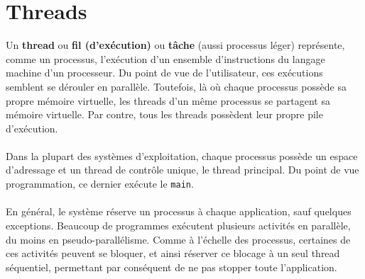 	\section{Threads}
		\begin{frame}
			Un \textbf{thread} ou \textbf{fil (d'exécution)} ou \textbf{tâche} (aussi processus léger) représente, comme un processus, l'exécution d'un ensemble d'instructions du langage machine d'un processeur. Du point de vue de l'utilisateur, ces exécutions semblent se dérouler en parallèle. Toutefois, là où chaque processus possède sa propre mémoire virtuelle, les threads d'un même processus se partagent sa mémoire virtuelle. Par contre, tous les threads possèdent leur propre pile d'exécution.
			\\~\\
			Dans la plupart des systèmes d'exploitation, chaque processus possède un espace d'adressage et un thread de contrôle unique, le thread principal. Du point de vue programmation, ce dernier exécute le \lstinline!main!.
			\\~\\
			En général, le système réserve un processus à chaque application, sauf quelques exceptions. Beaucoup de programmes exécutent plusieurs activités en parallèle, du moins en pseudo-parallélisme. Comme à l'échelle des processus, certaines de ces activités peuvent se bloquer, et ainsi réserver ce blocage à un seul thread séquentiel, permettant par conséquent de ne pas stopper toute l'application.
		\end{frame}	
		
